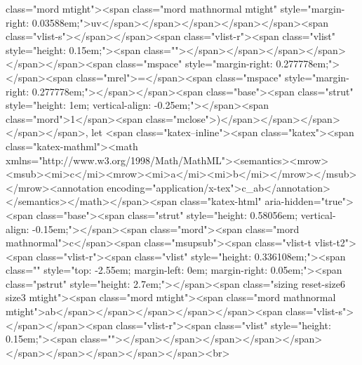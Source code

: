 class="mord mtight"><span class="mord mathnormal mtight" style="margin-right: 0.03588em;">uv</span></span></span></span></span><span class="vlist-s">​</span></span><span class="vlist-r"><span class="vlist" style="height: 0.15em;"><span class=""></span></span></span></span></span></span><span class="mspace" style="margin-right: 0.277778em;"></span><span class="mrel">=</span><span class="mspace" style="margin-right: 0.277778em;"></span></span><span class="base"><span class="strut" style="height: 1em; vertical-align: -0.25em;"></span><span class="mord">1</span><span class="mclose">)</span></span></span></span></span>, let <span class="katex--inline"><span class="katex"><span class="katex-mathml"><math xmlns="http://www.w3.org/1998/Math/MathML"><semantics><mrow><msub><mi>c</mi><mrow><mi>a</mi><mi>b</mi></mrow></msub></mrow><annotation encoding="application/x-tex">c_{ab}</annotation></semantics></math></span><span class="katex-html" aria-hidden="true"><span class="base"><span class="strut" style="height: 0.58056em; vertical-align: -0.15em;"></span><span class="mord"><span class="mord mathnormal">c</span><span class="msupsub"><span class="vlist-t vlist-t2"><span class="vlist-r"><span class="vlist" style="height: 0.336108em;"><span class="" style="top: -2.55em; margin-left: 0em; margin-right: 0.05em;"><span class="pstrut" style="height: 2.7em;"></span><span class="sizing reset-size6 size3 mtight"><span class="mord mtight"><span class="mord mathnormal mtight">ab</span></span></span></span></span><span class="vlist-s">​</span></span><span class="vlist-r"><span class="vlist" style="height: 0.15em;"><span class=""></span></span></span></span></span></span></span></span></span></span><br>
